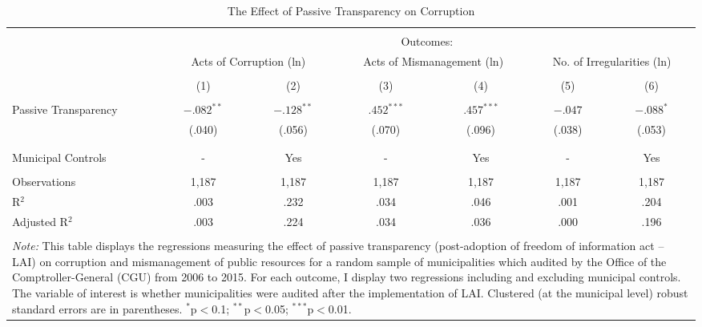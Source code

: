 
\begin{table}[!htbp] \centering
\caption{The Effect of Passive Transparency on Corruption}
\label{tab:corruption1}
\scriptsize
\begin{tabular}{@{\extracolsep{3pt}}lcccccc}
\\[-1.8ex]\hline
\hline \\[-1.8ex]
& \multicolumn{6}{c}{Outcomes:} \T \B \\
\cline{2-7}
& \multicolumn{2}{c}{Acts of Corruption (ln)} & \multicolumn{2}{c}{Acts of Mismanagement (ln)} & \multicolumn{2}{c}{No. of Irregularities (ln)} \T \B \\
\\[-1.8ex] & \multicolumn{1}{c}{(1)} & \multicolumn{1}{c}{(2)} & \multicolumn{1}{c}{(3)} & \multicolumn{1}{c}{(4)} & \multicolumn{1}{c}{(5)} & \multicolumn{1}{c}{(6)} \B\\
\hline \\[-1.8ex]
Passive Transparency & $-.082^{**}$ & $-.128^{**}$ & \hspace{1pt} $.452^{***}$ & \hspace{1pt} $.457^{***}$ & $-.047$ & $-.088^{*}$ \\
										 & (.040) & (.056) & (.070) & (.096) & (.038) & (.053) \\
										 & & & & & & \\
\hline \\[-1.8ex]
Municipal Controls & \multicolumn{1}{c}{-} & \multicolumn{1}{c}{Yes} & \multicolumn{1}{c}{-} & \multicolumn{1}{c}{Yes} & \multicolumn{1}{c}{-} & \multicolumn{1}{c}{Yes} \\
\hline \\[-1.8ex]
Observations & \multicolumn{1}{c}{1,187} & \multicolumn{1}{c}{1,187} & \multicolumn{1}{c}{1,187} & \multicolumn{1}{c}{1,187} & \multicolumn{1}{c}{1,187} & \multicolumn{1}{c}{1,187} \\
R$^{2}$ & \multicolumn{1}{c}{.003} & \multicolumn{1}{c}{.232} & \multicolumn{1}{c}{.034} & \multicolumn{1}{c}{.046} & \multicolumn{1}{c}{.001} & \multicolumn{1}{c}{.204} \\
Adjusted R$^{2}$ & \multicolumn{1}{c}{.003} & \multicolumn{1}{c}{.224} & \multicolumn{1}{c}{.034} & \multicolumn{1}{c}{.036} & \multicolumn{1}{c}{.000} & \multicolumn{1}{c}{.196} \\
\hline
\hline \\[-1.8ex]
\multicolumn{7}{p{.90\textwidth}}{\emph{Note:} This table displays the regressions measuring the effect of passive transparency (post-adoption of freedom of information act -- LAI) on corruption and mismanagement of public resources for a random sample of municipalities which audited by the Office of the Comptroller-General (CGU) from 2006 to 2015. For each outcome, I display two regressions including and excluding municipal controls. The variable of interest is whether municipalities were audited after the implementation of LAI. Clustered (at the municipal level) robust standard errors are in parentheses. $^{*}$p$<$0.1; $^{**}$p$<$0.05; $^{***}$p$<$0.01.} \\
\end{tabular}
\end{table}
